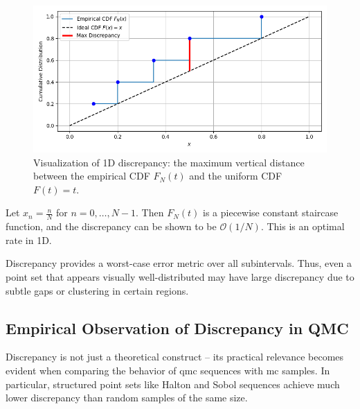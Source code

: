 \begin{figure}[H]
\centering
\includegraphics[scale=.67]{Figures/discrepancy1d.png}
\caption{Visualization of 1D discrepancy: the maximum vertical distance between the empirical CDF $F_N(t)$ and the uniform CDF $F(t) = t$.}
\label{fig:discrepancy-1d}
\end{figure}

\begin{example}
Let $x_n = \frac{n}{N}$ for $n = 0, \dots, N-1$. Then $F_N(t)$ is a
piecewise constant staircase function, and the discrepancy can be shown to be
$\mathcal{O}(1/N)$. This is an optimal rate in 1D.
\end{example}

\begin{remark}
Discrepancy provides a worst-case error metric over all subintervals. Thus, even
a point set that appears visually well-distributed may have large discrepancy
due to subtle gaps or clustering in certain regions.
\end{remark}

\subsection{Empirical Observation of Discrepancy in QMC}

Discrepancy is not just a theoretical construct -- its practical relevance
becomes evident when comparing the behavior of \ac{qmc} sequences with \ac{mc}
samples. In particular, structured point sets like Halton and Sobol sequences
achieve much lower discrepancy than random samples of the same size.

